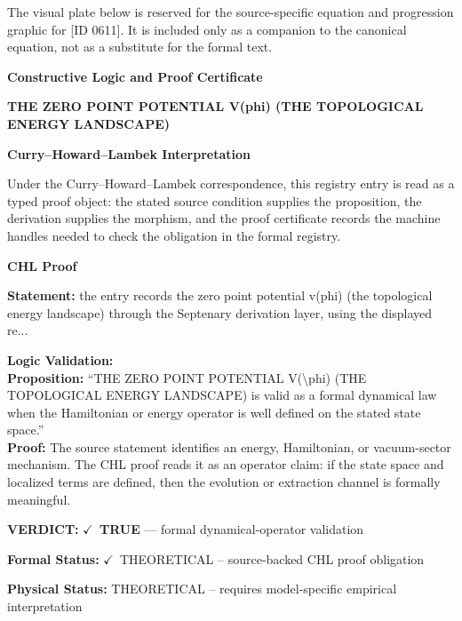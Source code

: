 \begingroup\footnotesize\sloppy
The visual plate below is reserved for the source-specific equation and progression graphic for [ID 0611]. It is included only as a companion to the canonical equation, not as a substitute for the formal text.
\par\endgroup
\ifTZPDarkEdition
{}
\fi

\clearpage
\begingroup\tzpsupportsetup
\noindent\textbf{\fontsize{10.8pt}{12.8pt}\selectfont [ID 0611] Constructive Logic and Proof Certificate}\par
\noindent\textbf{\fontsize{10pt}{12pt}\selectfont THE ZERO POINT POTENTIAL V(phi) (THE TOPOLOGICAL ENERGY LANDSCAPE)}\par
\vspace{0.45em}
\begingroup
\footnotesize
\setlength{\parskip}{0.22em}
\setlength{\parindent}{0pt}
\noindent\textbf{Curry--Howard--Lambek Interpretation}\par
Under the Curry--Howard--Lambek correspondence, this registry entry is read as a typed proof
object: the stated source condition supplies the proposition, the derivation supplies the
morphism, and the proof certificate records the machine handles needed to check the obligation
in the formal registry.

\vspace{0.45em}
\noindent\textbf{CHL Proof}\par
\textbf{Statement:} the entry records the zero point potential v(phi) (the topological energy landscape)
through the Septenary derivation layer, using the displayed re...

\textbf{Logic Validation:}\\
\textbf{Proposition:} ``THE ZERO POINT POTENTIAL V(\textbackslash{}phi) (THE TOPOLOGICAL ENERGY LANDSCAPE) is valid as a
formal dynamical law when the Hamiltonian or energy operator is well defined on the
stated state space.''\\
\textbf{Proof:} The source statement identifies an energy, Hamiltonian, or vacuum-sector mechanism. The
CHL proof reads it as an operator claim: if the state space and localized terms are
defined, then the evolution or extraction channel is formally meaningful.

\textbf{VERDICT:} \ensuremath{\checkmark}\ \textbf{TRUE} --- formal dynamical-operator validation

\textbf{Formal Status:} \ensuremath{\checkmark}\ THEORETICAL -- source-backed CHL proof obligation

\textbf{Physical Status:} THEORETICAL -- requires model-specific empirical interpretation
\par\vspace{0.45em}
\par
\ifTZPDarkEdition
{}
\fi
\endgroup
\endgroup
